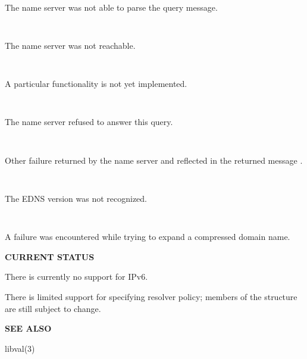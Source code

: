 \begin{description}
\item {}\verb" "

The name server was not able to parse the query message.

\item {}\verb" "

The name server was not reachable.

\item {}\verb" "

A particular functionality is not yet implemented.

\item {}\verb" "

The name server refused to answer this query.

\item {}\verb" "

Other failure returned by the name server and reflected in the
returned message .

\item {}\verb" "

The EDNS version was not recognized.

\item {}\verb" "

A failure was encountered while trying to expand a compressed domain name.

\end{description}

{\bf CURRENT STATUS}

There is currently no support for IPv6.

There is limited support for specifying resolver policy; members of the
 structure are still subject to change.

{\bf SEE ALSO}

libval(3)

